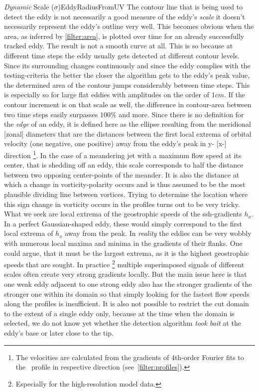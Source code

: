 \begin{filter}{\textit{Dynamic} Scale ($\sigma$)}{EddyRadiusFromUV}
 \label{filter:dynscale}
The contour line that is being used to detect the eddy is not
necessarily a good measure of the eddy's \textit{scale} \ie it doesn't
necessarily represent the eddy's outline very well. This becomes
obvious when the area, as inferred by \cref{filter:area}, is plotted over time
for an already successfully tracked eddy. The result is not a smooth curve at
all. This is so because at different time steps the eddy usually gets detected
at different contour levels. Since its surrounding changes continuously and
since the eddy complies with the testing-criteria the better the closer the
algorithm gets to the eddy's peak value, the determined area of the contour
jumps considerably between time steps. This is especially so for large flat
eddies with amplitudes on the order of $1cm$. If the contour increment is on
that scale as well, the difference in contour-area between two time steps
easily surpasses $100\%$ and more.
Since there is no definition for the \textit{edge} of an eddy, it is defined here as the ellipse resulting from the meridional [zonal] diameters that
are the distances between the first local extrema of orbital velocity (one negative, one positive) away from
the eddy's peak in y- [x-] direction \footnote{The velocities are calculated from the gradients of 4th-order Fourier fits to the \SSH~profile in respective direction (see~\cref{filter:profiles}).}.
In the case of a meandering jet with a maximum flow speed at its center, that
is shedding off an eddy, this scale corresponds to half the distance between
two opposing center-points of the meander. It is also the distance at which a
change in vorticity-polarity occurs and is thus assumed to be the most plausible
dividing line between vortices. 
Trying to determine the location where this sign change in vorticity occurs in the profiles turns out to be very tricky. What we seek are local extrema of the geostrophic speeds \ie of the ssh-gradients $h_x$. In a perfect Gaussian-shaped eddy, these would simply correspond to the first local extrema of $h_x$ away from the peak. In \textit{reality} the eddies can be very wobbly with numerous local maxima and minima in the gradients of their flanks. One could argue, that it must be the largest extrema, as it is the highest geostrophic speeds that are sought. In practice \footnote{Especially for the high-resolution model data.} multiple superimposed signals of different scales often create very strong gradients locally. But the main issue here is that one weak eddy adjacent to one strong eddy also has the stronger gradients of the stronger one within its domain so that simply looking for the fastest flow speeds along the profiles is insufficient. It is also not possible to restrict the cut domain to the extent of a single eddy only, because at the time when the domain is selected, we do not know yet whether the detection algorithm \textit{took bait} at the eddy's base or later close to the tip. \\

\end{filter}
